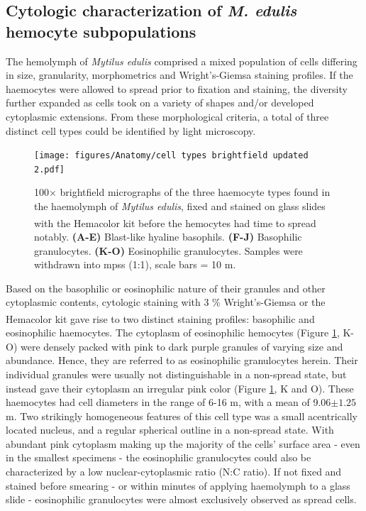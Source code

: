 \subsection{Cytologic characterization of \emph{M. edulis} hemocyte subpopulations}
\label{subsection:Results_cytchar}
The hemolymph of \emph{Mytilus edulis} comprised a mixed population of cells differing in size, granularity, morphometrics and Wright's-Giemsa staining profiles. If the haemocytes were allowed to spread prior to fixation and staining, the diversity further expanded as cells took on a variety of shapes and/or developed cytoplasmic extensions. From these morphological criteria, a total of three distinct cell types could be identified by light microscopy.

\begin{figure}[H]
    \centering
    \texttt{[image: figures/Anatomy/cell types brightfield updated 2.pdf]}
    \caption{100$\times$ brightfield micrographs of the three haemocyte types found in the haemolymph of \emph{Mytilus edulis}, fixed and stained on glass slides with the Hemacolor\textsuperscript{\textregistered} kit before the hemocytes had time to spread notably. \textbf{(A-E)} Blast-like hyaline basophils. \textbf{(F-J)} Basophilic granulocytes. \textbf{(K-O)} Eosinophilic granulocytes. Samples were withdrawn into \acrshort{mpss} (1:1), scale bars = 10 \micro m.}
    \label{fig:celltypes}
\end{figure}

Based on the basophilic or eosinophilic nature of their granules and other cytoplasmic contents, cytologic staining with 3 \% Wright's-Giemsa or the Hemacolor\textsuperscript{\textregistered} kit gave rise to two distinct staining profiles: basophilic and eosinophilic haemocytes. The cytoplasm of eosinophilic hemocytes (Figure \ref{fig:celltypes}, K-O) were densely packed with pink to dark purple granules of varying size and abundance. Hence, they are referred to as eosinophilic granulocytes herein. Their individual granules were usually not distinguishable in a non-spread state, but instead gave their cytoplasm an irregular pink color (Figure \ref{fig:celltypes}, K and O). These haemocytes had cell diameters in the range of 6-16 \micro m, with a mean of 9.06$\pm1.25$ \micro m. Two strikingly homogeneous features of this cell type was a small acentrically located nucleus, and a regular spherical outline in a non-spread state. With abundant pink cytoplasm making up the majority of the cells' surface area - even in the smallest specimens - the eosinophilic granulocytes could also be characterized by a low nuclear-cytoplasmic ratio (N:C ratio). If not fixed and stained before smearing - or within minutes of applying haemolymph to a glass slide - eosinophilic granulocytes were almost exclusively observed as spread cells. 

